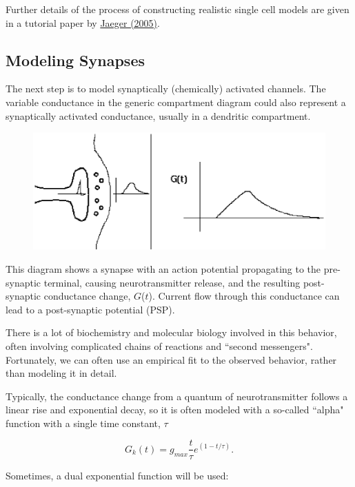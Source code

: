 \documentclass[12pt]{article}
\begin{document}
Further details of the process of constructing realistic single cell models are given in a tutorial paper by \href{../tutorial-jaeger/tutorial-jaeger.pdf}{Jaeger (2005)}.

\subsection*{Modeling Synapses}

The next step is to model synaptically (chemically) activated channels. The variable conductance in the generic compartment diagram could also represent a synaptically activated conductance, usually in a dendritic compartment.

\begin{figure}[h]
  \centering
 \includegraphics[scale=0.5]{figures/syncond.eps}
  \label{fig:purkinj5}
\end{figure}

This diagram shows a synapse with an action potential propagating to the pre-synaptic terminal, causing neurotransmitter release, and the resulting post-synaptic conductance change, $G$($t$). Current flow through this conductance can lead to a post-synaptic potential (PSP).

There is a lot of biochemistry and molecular biology involved in this behavior, often involving complicated chains of reactions and ``second messengers". Fortunately, we can often use an empirical fit to the observed behavior, rather than modeling it in detail.

Typically, the conductance change from a quantum of neurotransmitter follows a linear rise and exponential decay, so it is often modeled with a so-called ``alpha" function with a single time constant, $\tau$

\begin{displaymath}
	G_k(t) = g_{max}\frac{t}{\tau}e^{(1-t/\tau)}.
\end{displaymath}

Sometimes, a dual exponential function will be used:
\end{document}
